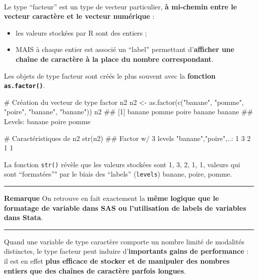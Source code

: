 \documentclass[12pt,twosided, notitlepage]{book}
\newenvironment{Shaded}{}{}
\newcommand{\KeywordTok}[1]{\textcolor[rgb]{0.00,0.00,1.00}{{#1}}}
\newcommand{\StringTok}[1]{\textcolor[rgb]{0.00,0.50,0.50}{{#1}}}
\newcommand{\CommentTok}[1]{\textcolor[rgb]{0.00,0.50,0.00}{{#1}}}
\newcommand{\NormalTok}[1]{{#1}}
\providecommand{\tightlist}{%
  \setlength{\itemsep}{0pt}\setlength{\parskip}{0pt}}
\renewenvironment{Shaded}{\begin{snugshade}}{\end{snugshade}}
\begin{document}
~

Le type \enquote{facteur} est un type de vecteur particulier, \textbf{à
mi-chemin entre le vecteur caractère et le vecteur numérique} :

\begin{itemize}
\tightlist
\item
  les valeurs stockées par R sont des entiers ;
\item
  MAIS à chaque entier est associé un \enquote{label} permettant
  d'\textbf{afficher une chaîne de caractère à la place du nombre
  correspondant}.
\end{itemize}

Les objets de type facteur sont créés le plus souvent avec la
\textbf{fonction \texttt{as.factor()}}.

\begin{Shaded}
\begin{Highlighting}[]
\CommentTok{# Création du vecteur de type factor n2}
\NormalTok{n2 <-}\StringTok{ }\KeywordTok{as.factor}\NormalTok{(}\KeywordTok{c}\NormalTok{(}\StringTok{"banane"}\NormalTok{, }\StringTok{"pomme"}\NormalTok{, }\StringTok{"poire"}\NormalTok{, }\StringTok{"banane"}\NormalTok{, }\StringTok{"banane"}\NormalTok{))}
\NormalTok{n2}
  \NormalTok{## [1] banane pomme  poire  banane banane}
  \NormalTok{## Levels: banane poire pomme}

\CommentTok{# Caractéristiques de n2}
\KeywordTok{str}\NormalTok{(n2)}
  \NormalTok{##  Factor w/ 3 levels "banane","poire",..: 1 3 2 1 1}
\end{Highlighting}
\end{Shaded}

La fonction \texttt{str()} révèle que les valeurs stockées sont 1, 3, 2,
1, 1, valeurs qui sont \enquote{formatées}" par le biais des
\enquote{labels} (\texttt{levels}) banane, poire,
pomme.

\begin{center}\rule{0.5\linewidth}{\linethickness}\end{center}

\textbf{Remarque} On retrouve en fait exactement la \textbf{même logique
que le formatage de variable dans SAS ou l'utilisation de labels de
variables dans Stata}.

\begin{center}\rule{0.5\linewidth}{\linethickness}\end{center}

Quand une variable de type caractère comporte un nombre limité de
modalités distinctes, le type facteur peut induire d'\textbf{importants
gains de performance} : il est en effet \textbf{plus efficace de stocker
et de manipuler des nombres entiers que des chaînes de caractère parfois
longues}.
\end{document}

